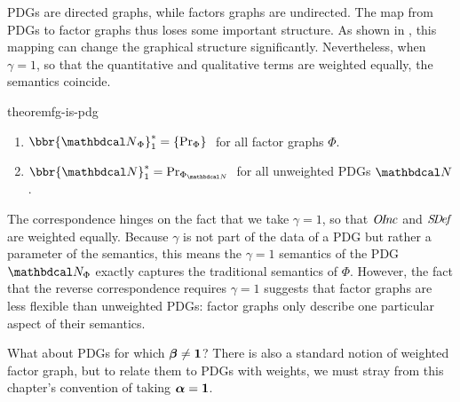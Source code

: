 PDGs are directed graphs, while factors graphs are undirected. The
map from PDGs to factor graphs thus loses some important structure.
As shown in , this mapping can change the graphical structure significantly.
Nevertheless, when $\gamma = 1$, so that the quantitative and qualitative terms are weighted equally, the semantics coincide. 


\begin{linked}{theorem}{fg-is-pdg}
    \label{theorem:pdg-is-fg}
\begin{enumerate}[label={(\alph*)}]
    \item
$\bbr{\UPDGof{\Phi}}_{1}^* = \{ \Pr_\Phi \} \;$ for all factor graphs
$\Phi$.%
\item
$\bbr{\dg N}_{1}^* = \Pr_{\FGof{\dg N}}\;$ for all unweighted
	PDGs $\dg N$.  
\end{enumerate}
\end{linked}

The correspondence hinges on the fact that we take $\gamma=1$, so that $\mathit{O\mskip-2.5muI\mskip-3.5mun\mskip-1.7muc}$ and
$\mathit{S\mskip-3.5muD\mskip-2.5mue\mskip-1.5muf}$ are weighted equally.
Because $\gamma$ is not part of the data of a PDG but rather a parameter of the semantics, this means
    the $\gamma=1$ semantics of the PDG $\dg N_\Phi$ exactly captures
    the traditional semantics of $\Phi$.
%
%
However, the fact that the reverse correspondence requires
$\gamma=1$ suggests that factor graphs are less flexible than unweighted PDGs: factor graphs only describe one particular aspect of their semantics.

What about 
PDGs for which $\boldsymbol\beta \ne {\mathbf 1}$?
There is also a standard notion of weighted factor graph,
    but to relate them to PDGs with weights, 
    we must stray from this chapter's 
    convention of taking $\boldsymbol\alpha = {\mathbf 1}$. 


